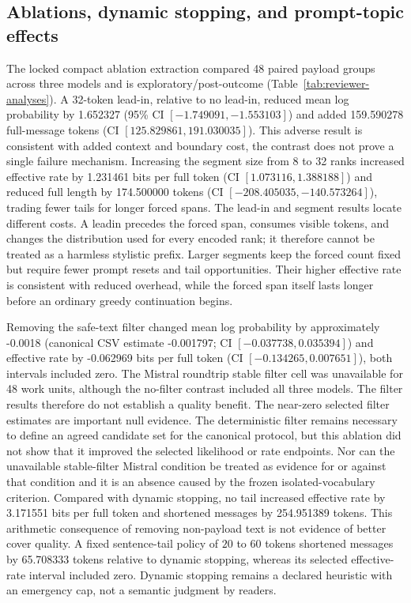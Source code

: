 \documentclass[fleqn,10pt]{wlscirep}
\begin{document}
\subsection*{Ablations, dynamic stopping, and prompt-topic effects}\label{sec:results-ablations}

The locked compact ablation extraction compared 48 paired payload groups across three models and is exploratory/post-outcome (Table~\ref{tab:reviewer-analyses}). A 32-token lead-in, relative to no lead-in, reduced mean log probability by 1.652327 (95\% CI \([-1.749091,\allowbreak -1.553103]\)) and added 159.590278 full-message tokens (CI \([125.829861,\allowbreak 191.030035]\)). This adverse result is consistent with added context and boundary cost, the contrast does not prove a single failure mechanism. Increasing the segment size from 8 to 32 ranks increased effective rate by 1.231461 bits per full token (CI \([1.073116,\allowbreak 1.388188]\)) and reduced full length by 174.500000 tokens (CI \([-208.405035,\allowbreak -140.573264]\)), trading fewer tails for longer forced spans.
The lead-in and segment results locate different costs. A leadin precedes the forced span, consumes visible tokens, and changes the distribution used for every encoded rank; it therefore cannot be treated as a harmless stylistic prefix. Larger segments keep the forced count fixed but require fewer prompt resets and tail opportunities. Their higher effective rate is consistent with reduced overhead, while the forced span itself lasts longer before an ordinary greedy continuation begins.

Removing the safe-text filter changed mean log probability by approximately -0.0018 (canonical CSV estimate -0.001797; CI \([-0.037738, 0.035394]\)) and effective rate by -0.062969 bits per full token (CI \([-0.134265, 0.007651]\)), both intervals included zero. The Mistral roundtrip stable filter cell was unavailable for 48 work units, although the no-filter contrast included all three models. The filter results therefore do not establish a quality benefit.
The near-zero selected filter estimates are important null evidence. The deterministic filter remains necessary to define an agreed candidate set for the canonical protocol, but this ablation did not show that it improved the selected likelihood or rate endpoints. Nor can the unavailable stable-filter Mistral condition be treated as evidence for or against that condition and it is an absence caused by the frozen isolated-vocabulary criterion.
Compared with dynamic stopping, no tail increased effective rate by 3.171551 bits per full token and shortened messages by 254.951389 tokens. This arithmetic consequence of removing non-payload text is not evidence of better cover quality. A fixed sentence-tail policy of \(20\) to \(60\) tokens shortened messages by 65.708333 tokens relative to dynamic stopping, whereas its selected effective-rate interval included zero. Dynamic stopping remains a declared heuristic with an emergency cap, not a semantic judgment by readers.
\end{document}
